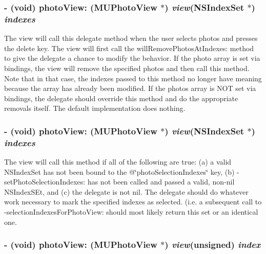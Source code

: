 \subsubsection{\setlength{\rightskip}{0pt plus 5cm}- (void) photo\-View: ({\bf MUPhoto\-View} $\ast$) {\em view}(NSIndex\-Set $\ast$) {\em indexes}}\label{category_n_s_object(_m_u_photo_view_delegate)_737863e6e2870e2aa5bb7ce21fc686ec}


The view will call this delegate method when the user selects photos and presses the delete key. The view will first call the will\-Remove\-Photos\-At\-Indexes: method to give the delegate a chance to modify the behavior. If the photo array is set via bindings, the view will remove the specified photos and then call this method. Note that in that case, the indexes passed to this method no longer have meaning because the array has already been modified. If the photos array is NOT set via bindings, the delegate should override this method and do the appropriate removals itself. The default implementation does nothing. 
\subsubsection{\setlength{\rightskip}{0pt plus 5cm}- (void) photo\-View: ({\bf MUPhoto\-View} $\ast$) {\em view}(NSIndex\-Set $\ast$) {\em indexes}}\label{category_n_s_object(_m_u_photo_view_delegate)_dc1847e0791f5e39310c5ca7b2caaef5}


The view will call this method if all of the following are true: (a) a valid NSIndex\-Set has not been bound to the @\char`\"{}photo\-Selection\-Indexes\char`\"{} key, (b) -set\-Photo\-Selection\-Indexes: has not been called and passed a valid, non-nil NSIndex\-SEt, and (c) the delegate is not nil. The delegate should do whatever work necessary to mark the specified indexes as selected. (i.e. a subsequent call to -selection\-Indexes\-For\-Photo\-View: should most likely return this set or an identical one. 
\subsubsection{\setlength{\rightskip}{0pt plus 5cm}- (void) photo\-View: ({\bf MUPhoto\-View} $\ast$) {\em view}(unsigned) {\em index}}\label{category_n_s_object(_m_u_photo_view_delegate)_b1d5136ccafab5ba223ab0f7ac70842f}


